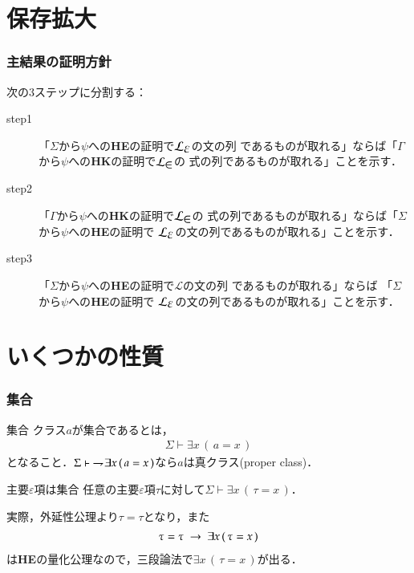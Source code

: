 \documentclass[dvipdfmx,10pt,notheorems]{beamer}
\theoremstyle{definition}
\newcommand{\lang}[1]{\mathcal{L}_{\scalebox{1.2}{$#1$}}} %
\newcommand{\negation}{\rightharpoondown\hspace{-0.25em}} %
\newcommand{\rarrow}{\hspace{0.25em}\rightarrow\hspace{0.25em}} %
\begin{document}
\section{保存拡大}
\begin{frame}\frametitle{主結果の証明方針}
	次の3ステップに分割する：
	\begin{description}
		\item[step1]  「$\Sigma$から$\psi$への{\bf HE}の証明で$\lang{\varepsilon}$の文の列
			であるものが取れる」ならば「$\Gamma$から$\psi$への{\bf HK}の証明で$\lang{\in}$の
			式の列であるものが取れる」ことを示す．
		
		\item[step2] 「$\Gamma$から$\psi$への{\bf HK}の証明で$\lang{\in}$の
			式の列であるものが取れる」ならば「$\Sigma$から$\psi$への{\bf HE}の証明で
			$\lang{\varepsilon}$の文の列であるものが取れる」ことを示す．
		
		\item[step3]  「$\Sigma$から$\psi$への{\bf HE}の証明で$\mathcal{L}$の文の列
			であるものが取れる」ならば 「$\Sigma$から$\psi$への{\bf HE}の証明で
			$\lang{\varepsilon}$の文の列であるものが取れる」ことを示す．
	\end{description}
\end{frame}

\section{いくつかの性質}
\begin{frame}\frametitle{集合}
	\begin{exampleblock}{集合}
	クラス$a$が集合であるとは，
	\begin{align}
		\Sigma \vdash \exists x\, (\, a = x\, )
	\end{align}
	となること．$\Sigma \vdash\ \negation \exists x\, (\, a = x\, )$なら$a$は真クラス(proper class)．
	\end{exampleblock}
	
	\begin{block}{主要$\varepsilon$項は集合}
		任意の主要$\varepsilon$項$\tau$に対して$\Sigma \vdash \exists x\, (\, \tau = x\, )$．
	\end{block}
	実際，外延性公理より$\tau = \tau$となり，また
	\begin{align}
		\tau = \tau \rarrow \exists x\, (\, \tau = x\, )
	\end{align}
	は{\bf HE}の量化公理なので，三段論法で$\exists x\, (\, \tau = x\, )$が出る．
\end{frame}
\end{document}
